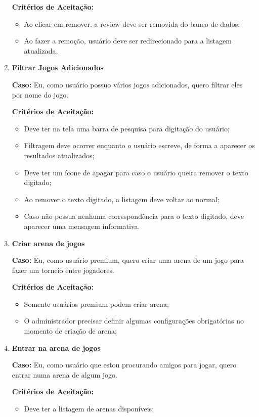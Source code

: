 \begin{enumerate}
  \textbf{Critérios de Aceitação:}
  \begin{itemize}
      \item Ao clicar em remover, a review deve ser removida do banco de dados;
      \item Ao fazer a remoção, usuário deve ser redirecionado para a listagem atualizada.
  \end{itemize}

  \item \textbf{Filtrar Jogos Adicionados}

  \textbf{Caso:} Eu, como usuário possuo vários jogos adicionados, quero filtrar eles por nome do jogo.

  \textbf{Critérios de Aceitação:}
  \begin{itemize}
      \item Deve ter na tela uma barra de pesquisa para digitação do usuário;
      \item Filtragem deve ocorrer enquanto o usuário escreve, de forma a aparecer os resultados atualizados;
      \item Deve ter um ícone de apagar para caso o usuário queira remover o texto digitado;
      \item Ao remover o texto digitado, a listagem deve voltar ao normal;
      \item Caso não possua nenhuma correspondência para o texto digitado, deve aparecer uma mensagem informativa.
  \end{itemize}

  \item \textbf{Criar arena de jogos}

   \textbf{Caso:} Eu, como usuário premium, quero criar uma arena de um jogo para fazer um torneio entre jogadores.

   \textbf{Critérios de Aceitação:}
  \begin{itemize}
      \item Somente usuários premium podem criar arena;
      \item O administrador precisar definir algumas configurações obrigatórias no momento de criação de arena;
  \end{itemize}

  \item \textbf{Entrar na arena de jogos}

   \textbf{Caso:} Eu, como usuário que estou procurando amigos para jogar, quero entrar numa arena de algum jogo.

   \textbf{Critérios de Aceitação:}
  \begin{itemize}
      \item Deve ter a listagem de arenas disponíveis;
  \end{itemize}
  
\end{enumerate}